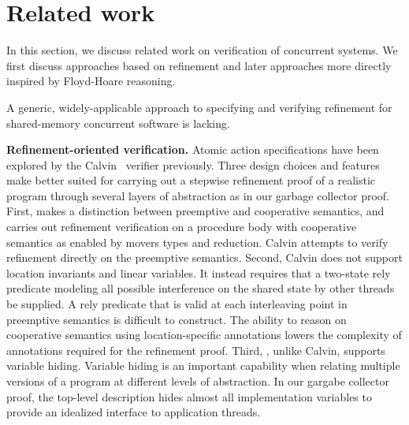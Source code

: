 
\section{Related work}
\label{sec:related}

In this section, we discuss related work on verification of concurrent systems.
We first discuss approaches based on refinement and later approaches more directly inspired 
by Floyd-Hoare reasoning.

A generic, widely-applicable approach to specifying and verifying refinement for shared-memory concurrent software is lacking. 

{\bf Refinement-oriented verification.}
Atomic action specifications have been explored by the
Calvin~\cite{FlanaganFQS05} verifier previously. 
Three design choices and features make \civl better suited for
carrying out a stepwise refinement proof of a realistic program
through several layers of abstraction as in our garbage collector
proof. 
First, \civl makes a distinction between preemptive and cooperative
semantics, and carries out refinement verification on a procedure body
with cooperative semantics as enabled by movers types and reduction. 
Calvin attempts to verify refinement directly on the preemptive semantics.
Second, Calvin does not support location invariants and linear variables. 
It instead requires that a two-state rely predicate modeling all possible
interference on the shared state by other threads be supplied. 
A rely predicate that is valid at each interleaving point in
preemptive semantics is difficult to construct. 
The ability to reason on cooperative semantics using location-specific
annotations lowers the complexity of annotations required for the refinement proof.
Third, \civl, unlike Calvin, supports variable hiding. Variable hiding
is an important capability when relating multiple versions of a
program at different levels of abstraction. In our gargabe collector
proof, the top-level description hides almost all implementation
variables to provide an idealized interface to application threads. 

